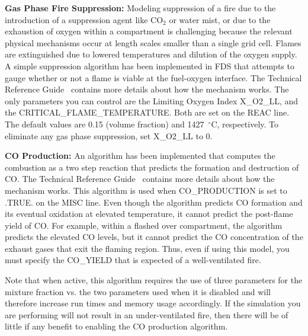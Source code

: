\documentclass[11pt]{book}
\begin{document}
\vspace{\baselineskip}
\noindent
{\bf Gas Phase Fire Suppression:}
Modeling suppression of a fire due to the introduction of a suppression
agent like CO$_2$ or water mist, or due to the exhaustion of oxygen
within a compartment is challenging because
the relevant physical mechanisms occur at length scales smaller than a
single grid cell. Flames are extinguished due to lowered
temperatures and dilution of the oxygen supply. A simple
suppression algorithm has been implemented in FDS that attempts to
gauge whether or not a flame is viable at the fuel-oxygen interface. The Technical Reference Guide~\cite{FDS_Tech_Guide_5}
contains more details about how the mechanism works. The only
parameters you can control are the Limiting
Oxygen Index {\ct X\_O2\_LL},
and the {\ct CRITICAL\_FLAME\_TEMPERATURE}. Both are
set on the {\ct REAC} line.
The default values are 0.15 (volume fraction) and 1427~$^\circ$C, respectively.
To eliminate any gas phase suppression, set {\ct X\_O2\_LL} to 0.

\vspace{\baselineskip}
\noindent
{\bf CO Production:}
An algorithm has been implemented that computes the combustion as a two step reaction that
predicts the formation and destruction of CO.  The Technical Reference Guide~\cite{FDS_Tech_Guide_5}
contains more details about how the mechanism works. This algorithm is used when
{\ct CO\_PRODUCTION} is set to {\ct .TRUE.} on the {\ct MISC} line. Even though the algorithm predicts
CO formation and its eventual oxidation at elevated temperature, it cannot predict the post-flame
yield of CO. For example, within a flashed over compartment, the algorithm predicts the elevated
CO levels, but it cannot predict the CO concentration of the exhaust gases that exit the flaming region.
Thus, even if using this model, you must specify the {\ct CO\_YIELD} that is expected of a well-ventilated fire.

\begin{warning}
\noindent
Note that when active, this algorithm requires the use of three parameters
for the mixture fraction vs. the two parameters used when it is disabled and will therefore
increase run times and memory usage accordingly.  If the simulation you are
performing will not result in an under-ventilated fire, then there will be of
little if any benefit to enabling the CO production algorithm.
\end{warning}



\clearpage
\end{document}
